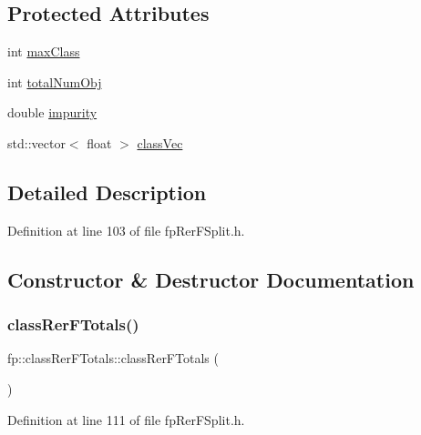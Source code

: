 \subsection*{Protected Attributes}
\begin{DoxyCompactItemize}
\item 
int \hyperlink{classfp_1_1classRerFTotals_a365f8e9aca77f5794fa1bc5fdd504670}{max\+Class}
\item 
int \hyperlink{classfp_1_1classRerFTotals_a0963284a03586b3a25c284bdb35f9e44}{total\+Num\+Obj}
\item 
double \hyperlink{classfp_1_1classRerFTotals_a8dfed045129bbae0420ff4094c137b1a}{impurity}
\item 
std\+::vector$<$ float $>$ \hyperlink{classfp_1_1classRerFTotals_a4a7b583fc52d7631771f5dd04d20a68a}{class\+Vec}
\end{DoxyCompactItemize}


\subsection{Detailed Description}


Definition at line 103 of file fp\+Rer\+F\+Split.\+h.



\subsection{Constructor \& Destructor Documentation}
\mbox{\label{classfp_1_1classRerFTotals_abd2507c1abb28e164bc8e8fb514e04b4}} 
\subsubsection{\texorpdfstring{class\+Rer\+F\+Totals()}{classRerFTotals()}}
{\footnotesize\ttfamily fp\+::class\+Rer\+F\+Totals\+::class\+Rer\+F\+Totals (\begin{DoxyParamCaption}{ }\end{DoxyParamCaption})\hspace{0.3cm}{\ttfamily [inline]}}



Definition at line 111 of file fp\+Rer\+F\+Split.\+h.


